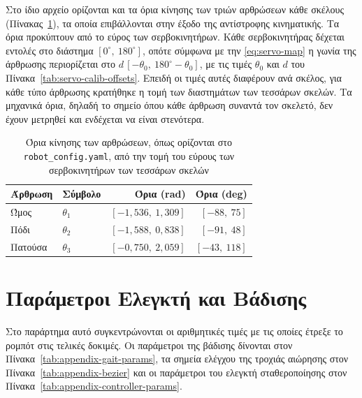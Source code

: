 \documentclass[11pt]{report}
\begin{document}
Στο ίδιο αρχείο ορίζονται και τα όρια κίνησης των τριών αρθρώσεων κάθε σκέλους
(Πίνακας~\ref{tab:appendix-joint-limits}), τα οποία επιβάλλονται στην έξοδο
της αντίστροφης κινηματικής. Τα όρια προκύπτουν από το εύρος των
σερβοκινητήρων. Κάθε σερβοκινητήρας δέχεται εντολές στο διάστημα
$[0^\circ,\ 180^\circ]$, οπότε σύμφωνα με την \eqref{eq:servo-map} η γωνία της
άρθρωσης περιορίζεται στο $d\,[-\theta_0,\ 180^\circ - \theta_0]$, με τις τιμές
$\theta_0$ και $d$ του Πίνακα~\ref{tab:servo-calib-offsets}. Επειδή οι τιμές
αυτές διαφέρουν ανά σκέλος, για κάθε τύπο άρθρωσης κρατήθηκε η τομή των
διαστημάτων των τεσσάρων σκελών. Τα μηχανικά όρια, δηλαδή το σημείο όπου κάθε
άρθρωση συναντά τον σκελετό, δεν έχουν μετρηθεί και ενδέχεται να είναι
στενότερα.

\begin{table}[htbp]
    \centering
    \small
    \begin{tabular}{@{}l l r r@{}}
        \toprule
        Άρθρωση & Σύμβολο & Όρια (rad) & Όρια (deg) \\
        \midrule
        Ώμος & $\theta_1$ & $[-1{,}536,\ 1{,}309]$ & $[-88,\ 75]$ \\
        Πόδι & $\theta_2$ & $[-1{,}588,\ 0{,}838]$ & $[-91,\ 48]$ \\
        Πατούσα & $\theta_3$ & $[-0{,}750,\ 2{,}059]$ & $[-43,\ 118]$ \\
        \bottomrule
    \end{tabular}
    \caption[Όρια κίνησης των αρθρώσεων]{Όρια κίνησης των αρθρώσεων, όπως
    ορίζονται στο \texttt{robot\_config.yaml}, από την τομή του εύρους των
    σερβοκινητήρων των τεσσάρων σκελών}
    \label{tab:appendix-joint-limits}
\end{table}

\chapter{Παράμετροι Ελεγκτή και Βάδισης}
\label{app:parameters}
Στο παράρτημα αυτό συγκεντρώνονται οι αριθμητικές τιμές με τις οποίες έτρεξε το
ρομπότ στις τελικές δοκιμές. Οι παράμετροι της βάδισης δίνονται στον
Πίνακα~\ref{tab:appendix-gait-params}, τα σημεία ελέγχου της τροχιάς αιώρησης
στον Πίνακα~\ref{tab:appendix-bezier} και οι παράμετροι του ελεγκτή
σταθεροποίησης στον Πίνακα~\ref{tab:appendix-controller-params}.
\end{document}
